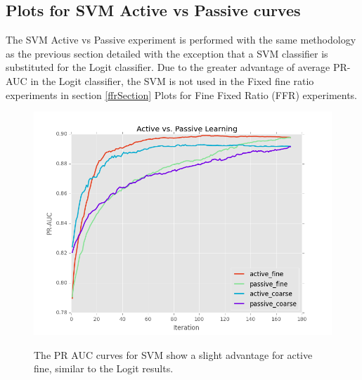 \documentclass[ms]{nuthesis}
\begin{document}
\clearpage

\subsection{Plots for SVM Active vs Passive curves}
\par The SVM Active vs Passive experiment is performed with the same methodology
as the previous section detailed with the exception that a SVM classifier is
substituted for the Logit classifier. Due to the greater advantage of average
PR-AUC in the Logit classifier, the SVM is not used in the Fixed fine ratio
experiments in section \ref{ffrSection} Plots for Fine Fixed Ratio (FFR) experiments.

\FloatBarrier
\begin{figure}[!htb]
	\centering
    \includegraphics[width=1.0\columnwidth]{fig/runActPassSVM_pr}
    \label{fig:ActiveVsPassivePRSVM}
    \caption{The PR AUC curves for SVM show a slight advantage for active fine,
     similar to the Logit results.}
\end{figure}
\FloatBarrier
\end{document}
